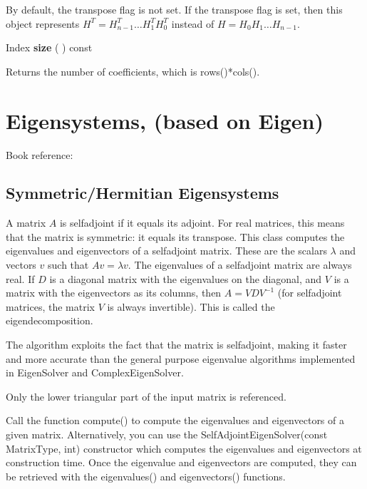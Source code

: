 By default, the transpose flag is not set. If the transpose flag is set, then this object represents $H^T = H_{n-1}^T \ldots H_1^T H_0^T$ instead of  $H=H_0 H_1 \ldots H_{n-1}$.


\vspace{0.3cm}
Index \textbf{size}  ( )  const 

Returns the number of coefficients, which is rows()*cols(). 







\chapter{Eigensystems, (based on Eigen)}
\label{LinearAlgebra} %

Book reference: \cite{Golub1996}



\section{Symmetric/Hermitian Eigensystems}
\label{Real Symmetric Eigensystem}


A matrix $A$ is selfadjoint if it equals its adjoint. For real matrices, this means that the matrix is symmetric: it equals its transpose. This class computes the eigenvalues and eigenvectors of a selfadjoint matrix. These are the scalars $\lambda$ and vectors $v$  such that $A v=\lambda v$. The eigenvalues of a selfadjoint matrix are always real. If $D$ is a diagonal matrix with the eigenvalues on the diagonal, and $V$ is a matrix with the eigenvectors as its columns, then $A=V D V^{-1}$ (for selfadjoint matrices, the matrix $V$ is always invertible). This is called the eigendecomposition.

The algorithm exploits the fact that the matrix is selfadjoint, making it faster and more accurate than the general purpose eigenvalue algorithms implemented in EigenSolver and ComplexEigenSolver.

Only the lower triangular part of the input matrix is referenced.

Call the function compute() to compute the eigenvalues and eigenvectors of a given matrix. Alternatively, you can use the SelfAdjointEigenSolver(const MatrixType, int) constructor which computes the eigenvalues and eigenvectors at construction time. Once the eigenvalue and eigenvectors are computed, they can be retrieved with the eigenvalues() and eigenvectors() functions.


